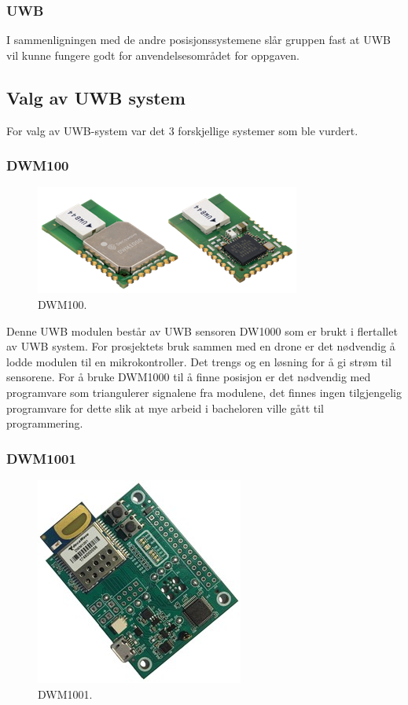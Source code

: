 \subsubsection{UWB}
I sammenligningen med de andre posisjonssystemene slår gruppen fast at UWB vil kunne fungere godt for anvendelsesområdet for oppgaven. 

\subsection{Valg av UWB system}
For valg av UWB-system var det 3 forskjellige systemer som ble vurdert.

\subsubsection{DWM100}

\begin{figure}[htp]
\centering
\includegraphics[width=0.5\columnwidth]{figures/dwm100}
\caption{DWM100.}
\label{fig:dwm100}
\end{figure}

Denne UWB modulen består av UWB sensoren DW1000 som er brukt i flertallet av UWB system. For prosjektets bruk sammen med en drone er det nødvendig å lodde modulen til en mikrokontroller. Det trengs og en løsning for å gi strøm til sensorene. 
For å bruke DWM1000 til å finne posisjon er det nødvendig med programvare som triangulerer signalene fra modulene, det finnes ingen tilgjengelig programvare for dette slik at mye arbeid i bacheloren ville gått til programmering. 

\subsubsection{DWM1001}

\begin{figure}[htp]
\centering
\includegraphics[width=0.4\columnwidth]{figures/dwm1001}
\caption{DWM1001.}
\label{fig:dwm1001}
\end{figure}

